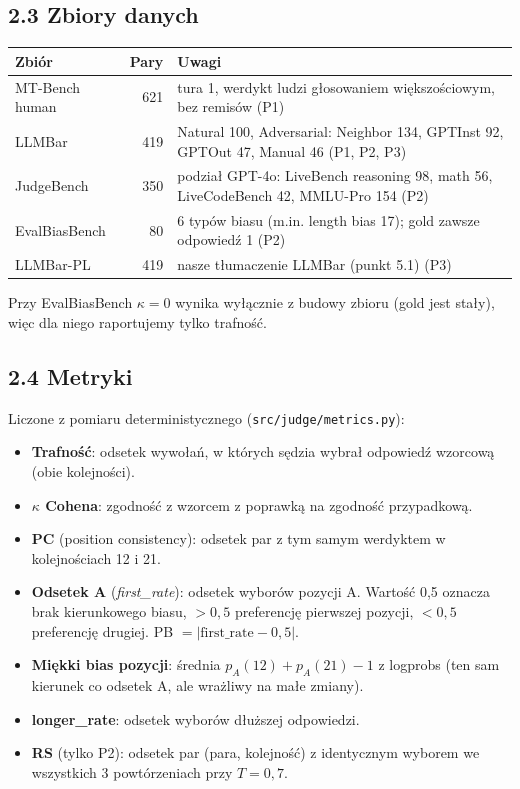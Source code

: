 \documentclass[10pt,a4paper]{article}
\begin{document}
\subsection*{2.3 Zbiory danych}
\begin{tabularx}{\linewidth}{@{}l r Y@{}}
\toprule
Zbiór & Pary & Uwagi \\
\midrule
MT-Bench human & 621 & tura 1, werdykt ludzi głosowaniem większościowym, bez remisów (P1) \\
LLMBar & 419 & Natural 100, Adversarial: Neighbor 134, GPTInst 92, GPTOut 47, Manual 46 (P1, P2, P3) \\
JudgeBench & 350 & podział GPT-4o: LiveBench reasoning 98, math 56, LiveCodeBench 42, MMLU-Pro 154 (P2) \\
EvalBiasBench & 80 & 6 typów biasu (m.in. length bias 17); gold zawsze odpowiedź 1 (P2) \\
LLMBar-PL & 419 & nasze tłumaczenie LLMBar (punkt 5.1) (P3) \\
\bottomrule
\end{tabularx}

Przy EvalBiasBench $\kappa=0$ wynika wyłącznie z budowy zbioru (gold jest stały), więc dla niego raportujemy tylko trafność.

\subsection*{2.4 Metryki}
Liczone z pomiaru deterministycznego (\texttt{src/judge/metrics.py}):
\begin{itemize}
  \item \textbf{Trafność}: odsetek wywołań, w których sędzia wybrał odpowiedź wzorcową (obie kolejności).
  \item \textbf{$\kappa$ Cohena}: zgodność z wzorcem z poprawką na zgodność przypadkową.
  \item \textbf{PC} (position consistency): odsetek par z tym samym werdyktem w kolejnościach 12 i 21.
  \item \textbf{Odsetek A} (\emph{first\_rate}): odsetek wyborów pozycji A. Wartość 0,5 oznacza brak kierunkowego biasu, $>0{,}5$ preferencję pierwszej pozycji, $<0{,}5$ preferencję drugiej. PB $=|\text{first\_rate}-0{,}5|$.
  \item \textbf{Miękki bias pozycji}: średnia $p_A(12)+p_A(21)-1$ z logprobs (ten sam kierunek co odsetek A, ale wrażliwy na małe zmiany).
  \item \textbf{longer\_rate}: odsetek wyborów dłuższej odpowiedzi.
  \item \textbf{RS} (tylko P2): odsetek par (para, kolejność) z identycznym wyborem we wszystkich 3 powtórzeniach przy $T=0{,}7$.
\end{itemize}
\end{document}
